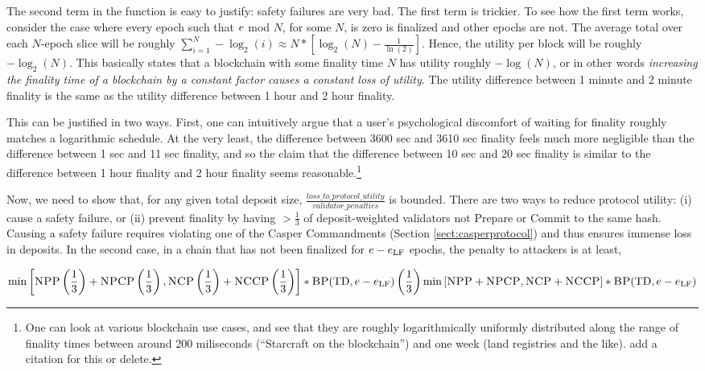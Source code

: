 \documentclass[12pt, final]{article}
\newcommand*{\todo}[1]{\color{red} #1}
\newcommand{\epoch}{\ensuremath{e}\space}
\newcommand{\totaldeposit}{\textnormal{TD}\space}
\newcommand{\epochLF}{\ensuremath{\epoch_{\textnormal{LF}}}\space}
\newcommand{\BP}{\textsc{BP}\space}
\newcommand{\NCP}{\textsc{NCP}\space}
\newcommand{\NCCP}{\textsc{NCCP}\space}
\newcommand{\NPP}{\textsc{NPP}\space}
\newcommand{\NPCP}{\textsc{NPCP}\space}
\begin{document}
The second term in the function is easy to justify: safety failures are very bad. The first term is trickier. To see how the first term works, consider the case where every epoch such that $\epoch$ mod $N$, for some $N$, is zero is finalized and other epochs are not. The average total over each $N$-epoch slice will be roughly $\sum_{i=1}^N -\log_2(i) \approx N * \left[ \log_2(N) - \frac{1}{\ln(2)} \right]$. Hence, the utility per block will be roughly $-\log_2(N)$. This basically states that a blockchain with some finality time $N$ has utility roughly $-\log(N)$, or in other words \emph{increasing the finality time of a blockchain by a constant factor causes a constant loss of utility}. The utility difference between 1 minute and 2 minute finality is the same as the utility difference between 1 hour and 2 hour finality.

This can be justified in two ways. First, one can intuitively argue that a user's psychological discomfort of waiting for finality roughly matches a logarithmic schedule. At the very least, the difference between 3600 sec and 3610 sec finality feels much more negligible than the difference between 1 sec and 11 sec finality, and so the claim that the difference between 10 sec and 20 sec finality is similar to the difference between 1 hour finality and 2 hour finality seems reasonable.\footnote{One can look at various blockchain use cases, and see that they are roughly logarithmically uniformly distributed along the range of finality times between around 200 miliseconds (``Starcraft on the blockchain'') and one week (land registries and the like). \todo{add a citation for this or delete.}}

Now, we need to show that, for any given total deposit size, $\frac{loss\_to\_protocol\_utility}{validator\_penalties}$ is bounded. There are two ways to reduce protocol utility: (i) cause a safety failure, or (ii) prevent finality by having $> \frac{1}{3}$ of deposit-weighted validators not Prepare or Commit to the same hash.  Causing a safety failure requires violating one of the Casper Commandments (Section \ref{sect:casperprotocol}) and thus ensures immense loss in deposits.  In the second case, in a chain that has not been finalized for $\epoch - \epochLF$ epochs, the penalty to attackers is at least,

\begin{equation}
\min \left[ \NPP \left(\frac{1}{3}\right) + \NPCP\left(\frac{1}{3}\right), \NCP \left(\frac{1}{3}\right) + \NCCP\left(\frac{1}{3}\right) \right] * \BP(\totaldeposit, \epoch - \epochLF) \\
\left(\frac{1}{3}\right) \min \left[ \NPP + \NPCP, \NCP + \NCCP \right] * \BP(\totaldeposit, \epoch - \epochLF) \\
\end{equation}
\end{document}
